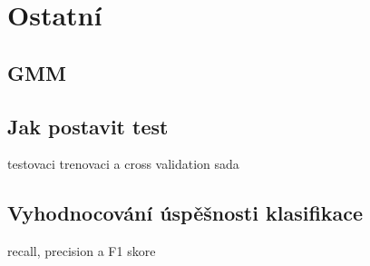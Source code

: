 
\chapter{Ostatní}


\section{GMM}

\section{Jak postavit test}
\par{testovaci trenovaci a cross validation sada}

\section{Vyhodnocování úspěšnosti klasifikace}
\par{recall, precision a F1 skore}